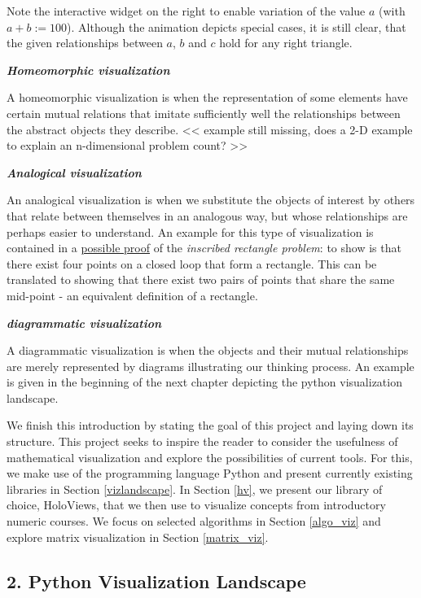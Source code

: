 \documentclass[11pt]{article}
\begin{document}
    Note the interactive widget on the right to enable variation of the
value \(a\) (with \(a+b:=100\)). Although the animation depicts special
cases, it is still clear, that the given relationships between \(a\),
\(b\) and \(c\) hold for any right triangle.

\textbf{\emph{Homeomorphic visualization}}

A homeomorphic visualization is when the representation of some elements
have certain mutual relations that imitate sufficiently well the
relationships between the abstract objects they describe.
\textless{}\textless{} example still missing, does a 2-D example to
explain an n-dimensional problem count? \textgreater{}\textgreater{}

\textbf{\emph{Analogical visualization}}

An analogical visualization is when we substitute the objects of
interest by others that relate between themselves in an analogous way,
but whose relationships are perhaps easier to understand. An example for
this type of visualization is contained in a
\href{https://www.youtube.com/watch?v=AmgkSdhK4K8}{possible proof} of
the \emph{inscribed rectangle problem}: to show is that there exist four
points on a closed loop that form a rectangle. This can be translated to
showing that there exist two pairs of points that share the same
mid-point - an equivalent definition of a rectangle.

\textbf{\emph{diagrammatic visualization}}

A diagrammatic visualization is when the objects and their mutual
relationships are merely represented by diagrams illustrating our
thinking process. An example is given in the beginning of the next
chapter depicting the python visualization landscape.

    We finish this introduction by stating the goal of this project and
laying down its structure. This project seeks to inspire the reader to
consider the usefulness of mathematical visualization and explore the
possibilities of current tools. For this, we make use of the programming
language Python and present currently existing libraries in
Section \ref{vizlandscape}. In Section \ref{hv}, we present our library
of choice, HoloViews, that we then use to visualize concepts from
introductory numeric courses. We focus on selected algorithms in
Section \ref{algo_viz} and explore matrix visualization in
Section \ref{matrix_viz}.

    \subsection{2. Python Visualization Landscape
}\label{python-visualization-landscape}
\end{document}
